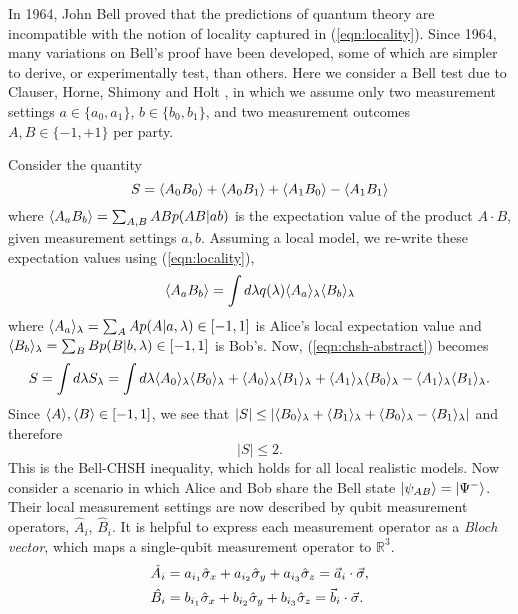 In 1964, John Bell proved \cite{Bell1964c} that the predictions of quantum theory are incompatible with the notion of locality captured in (\ref{eqn:locality}). Since 1964, many variations on Bell's proof have been developed, some of which are simpler to derive, or experimentally test, than others. Here we consider a Bell test due to Clauser, Horne, Shimony and Holt \cite{Clauser1969}, in which we assume only two measurement settings $a \in \{a_0, a_1\}$, $b \in \{b_0, b_1\}$,  and two measurement outcomes $A, B \in \{-1, +1\}$ per party. 

Consider the quantity
\begin{equation}
S = \langle A_0B_0 \rangle + \langle A_0B_1 \rangle + \langle A_1B_0 \rangle - \langle A_1B_1 \rangle
\label{eqn:chsh-abstract}
\end{equation}
where $\langle A_a B_b \rangle = \sum_{A,B} AB p(AB|ab)$ is the expectation value of the product $A\cdot B$, given measurement settings $a, b$. Assuming a local model, we re-write these expectation values using (\ref{eqn:locality}),
\begin{equation}
\langle A_a B_b \rangle = \int d \lambda q(\lambda) \langle A_a \rangle_\lambda \langle B_b \rangle_\lambda
\end{equation}
where $\langle A_a \rangle_\lambda = \sum_A A p (A | a, \lambda) \in \left[ -1, 1 \right]$ is Alice's local expectation value and $\langle B_b \rangle_\lambda = \sum_B B p (B | b, \lambda) \in \left[ -1, 1 \right]$ is Bob's. Now, (\ref{eqn:chsh-abstract}) becomes
\begin{equation}
S=\int d\lambda S_\lambda = \int d\lambda 
\langle A_0 \rangle_\lambda \langle B_0 \rangle_\lambda + \langle A_0 \rangle_\lambda \langle B_1 \rangle_\lambda + \langle A_1 \rangle_\lambda \langle B_0 \rangle_\lambda - \langle A_1 \rangle_\lambda \langle B_1 \rangle_\lambda.
\end{equation}
Since $\langle A \rangle, \langle B \rangle \in \left[-1, 1\right]$, we see that $|S| \le | \langle B_0 \rangle_\lambda + \langle B_1 \rangle_\lambda + \langle B_0 \rangle_\lambda - \langle B_1 \rangle_\lambda |$  and therefore 
\begin{equation}
|S| \le 2.
\label{eqn:chsh-inequality}
\end{equation}
This is the Bell-CHSH inequality, which holds for all local realistic models.  Now consider a scenario in which Alice and Bob share the Bell state $\mbox{$ | \psi_{AB} \rangle $} = \mbox{$ | \Psi^- \rangle $}$. Their local measurement settings are now described by qubit measurement operators, $\hat{A}_i$, $\hat{B}_i$. It is helpful to express each measurement operator as a \emph{Bloch vector}, which maps a single-qubit measurement operator to $\mathbb{R}^3$. 
\begin{align}
    &\hat{A_i} = a_{i_1} \hat{\sigma}_x + a_{i_2} \hat{\sigma}_y + a_{i_3} \hat{\sigma}_z = \vec{a}_i \cdot \vec{\sigma},\\
    &\hat{B_i} = b_{i_1} \hat{\sigma}_x + b_{i_2} \hat{\sigma}_y + b_{i_3} \hat{\sigma}_z = \vec{b}_i \cdot \vec{\sigma}.
    \label{eqn:bloch-vectors}
\end{align}
